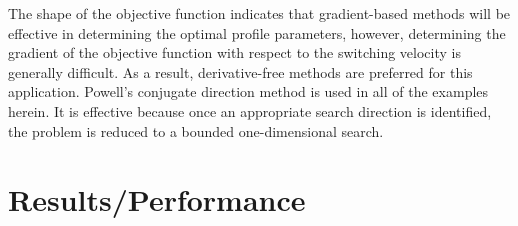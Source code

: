 \documentclass[letterpaper, preprint, paper,11pt]{AAS}
\begin{document}
The shape of the objective function indicates that gradient-based methods will be effective in determining the optimal profile parameters, however, determining the gradient of the objective function with respect to the switching velocity is generally difficult. As a result, derivative-free methods are preferred for this application. Powell's conjugate direction method is used in all of the examples herein. It is effective because once an appropriate search direction is identified, the problem is reduced to a bounded one-dimensional search. 
%
%
%
%
\section{Results/Performance}




\end{document}
